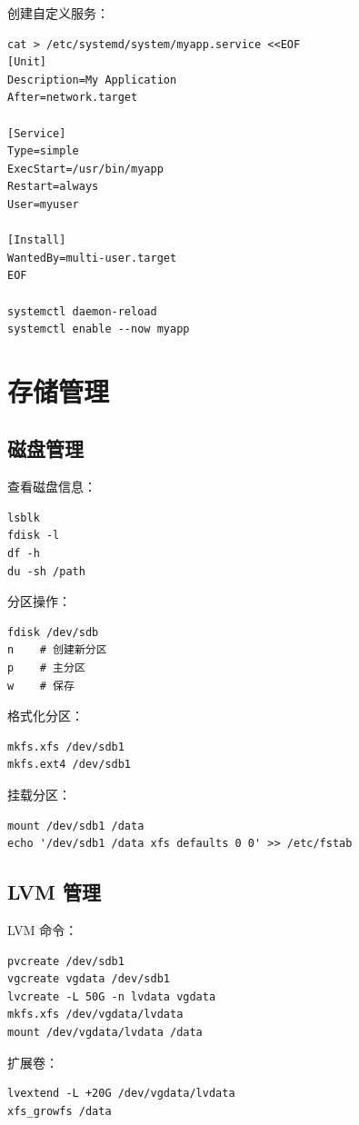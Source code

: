 \documentclass[12pt,UTF8]{ctexbook}
\begin{document}
创建自定义服务：
\begin{verbatim}
cat > /etc/systemd/system/myapp.service <<EOF
[Unit]
Description=My Application
After=network.target

[Service]
Type=simple
ExecStart=/usr/bin/myapp
Restart=always
User=myuser

[Install]
WantedBy=multi-user.target
EOF

systemctl daemon-reload
systemctl enable --now myapp
\end{verbatim}

\chapter{存储管理}
\label{chap:storage}

\section{磁盘管理}
\label{sec:disk_management}

查看磁盘信息：
\begin{verbatim}
lsblk
fdisk -l
df -h
du -sh /path
\end{verbatim}

分区操作：
\begin{verbatim}
fdisk /dev/sdb
n    # 创建新分区
p    # 主分区
w    # 保存
\end{verbatim}

格式化分区：
\begin{verbatim}
mkfs.xfs /dev/sdb1
mkfs.ext4 /dev/sdb1
\end{verbatim}

挂载分区：
\begin{verbatim}
mount /dev/sdb1 /data
echo '/dev/sdb1 /data xfs defaults 0 0' >> /etc/fstab
\end{verbatim}

\section{LVM 管理}
\label{sec:lvm_management}

LVM 命令：
\begin{verbatim}
pvcreate /dev/sdb1
vgcreate vgdata /dev/sdb1
lvcreate -L 50G -n lvdata vgdata
mkfs.xfs /dev/vgdata/lvdata
mount /dev/vgdata/lvdata /data
\end{verbatim}

扩展卷：
\begin{verbatim}
lvextend -L +20G /dev/vgdata/lvdata
xfs_growfs /data
\end{verbatim}
\end{document}

